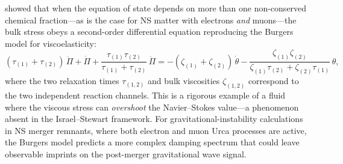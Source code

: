 \citet{GavassinoBurgers2023} showed that when the equation of state
depends on more than one non-conserved chemical fraction---as is the
case for NS matter with electrons \emph{and} muons---the bulk stress
obeys a second-order differential equation reproducing the Burgers
model for viscoelasticity:
\begin{equation}
\label{eq:rel-13-Burgers-eom}
(\tau_{(1)}+\tau_{(2)})\,\ddot{\Pi}
  + \dot{\Pi}
  + \frac{\tau_{(1)}\tau_{(2)}}{\tau_{(1)}+\tau_{(2)}}\,\ddot{\Pi}
= -(\zeta_{(1)}+\zeta_{(2)})\,\dot{\theta}
  - \frac{\zeta_{(1)}\zeta_{(2)}}
    {\zeta_{(1)}\tau_{(2)}+\zeta_{(2)}\tau_{(1)}}\,\theta,
\end{equation}
where the two relaxation times $\tau_{(1,2)}$ and bulk viscosities
$\zeta_{(1,2)}$ correspond to the two independent reaction channels.
This is a rigorous example of a fluid where the viscous stress can
\emph{overshoot} the Navier--Stokes value---a phenomenon absent in the
Israel--Stewart framework.  For gravitational-instability calculations
in NS merger remnants, where both electron and muon Urca processes
are active, the Burgers model predicts a more complex damping spectrum
that could leave observable imprints on the post-merger gravitational
wave signal.
